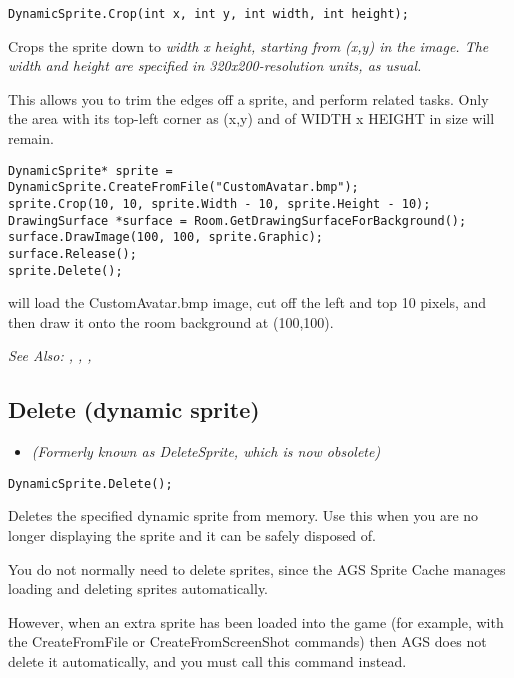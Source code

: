 \begin{verbatim}
DynamicSprite.Crop(int x, int y, int width, int height);
\end{verbatim}
Crops the sprite down to \it{width} x \it{height}, starting from (x,y) in the image.
The width and height are specified in 320x200-resolution units, as usual.

This allows you to trim the edges off a sprite, and perform related tasks. Only the area
with its top-left corner as (x,y) and of WIDTH x HEIGHT in size will remain.

\begin{verbatim}
DynamicSprite* sprite = DynamicSprite.CreateFromFile("CustomAvatar.bmp");
sprite.Crop(10, 10, sprite.Width - 10, sprite.Height - 10);
DrawingSurface *surface = Room.GetDrawingSurfaceForBackground();
surface.DrawImage(100, 100, sprite.Graphic);
surface.Release();
sprite.Delete();
\end{verbatim}
will load the CustomAvatar.bmp image, cut off the left and top 10 pixels, and then
draw it onto the room background at (100,100).

\it{See Also:} ,
,
,


\subsection{Delete (dynamic sprite)}\label{DynamicSprite.Delete}%

\begin{itemize}
\item \it{(Formerly known as DeleteSprite, which is now obsolete)}
\end{itemize}

\begin{verbatim}
DynamicSprite.Delete();
\end{verbatim}
Deletes the specified dynamic sprite from memory. Use this when you are no longer displaying
the sprite and it can be safely disposed of.

You do not normally need to delete sprites, since the AGS Sprite Cache manages loading
and deleting sprites automatically.

However, when an extra sprite has been loaded into the game (for example, with the
CreateFromFile or CreateFromScreenShot commands) then AGS does not delete it automatically,
and you must call this command instead.

